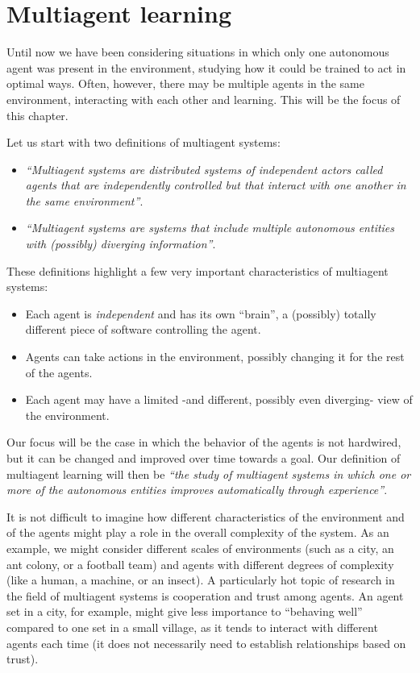 \chapter{Multiagent learning}
Until now we have been considering situations in which only one autonomous agent was present in the environment, studying how it could be trained to act in optimal ways. Often, however, there may be multiple agents in the same environment, interacting with each other and learning. This will be the focus of this chapter.

Let us start with two definitions of multiagent systems:

\begin{itemize}
    \item \textit{``Multiagent systems are distributed systems of independent actors called agents that are independently controlled but that interact with one another in the same environment''}. \cite{wooldridge02} \cite{10.1007/978-3-030-01713-2_1}
    \item \textit{``Multiagent systems are systems that include multiple autonomous entities with (possibly) diverging information''}. \cite{ShohamLeytonBrown09}
\end{itemize}

These definitions highlight a few very important characteristics of multiagent systems:

\begin{itemize}
    \item Each agent is \textit{independent} and has its own ``brain'', a (possibly) totally different piece of software controlling the agent.
    \item Agents can take actions in the environment, possibly changing it for the rest of the agents.
    \item Each agent may have a limited -and different, possibly even diverging- view of the environment.
\end{itemize}

Our focus will be the case in which the behavior of the agents is not hardwired, but it can be changed and improved over time towards a goal. Our definition of multiagent learning will then be \textit{``the study of multiagent systems in which one or more of the autonomous entities improves automatically through experience''}.

It is not difficult to imagine how different characteristics of the environment and of the agents might play a role in the overall complexity of the system. As an example, we might consider different scales of environments (such as a city, an ant colony, or a football team) and agents with different degrees of complexity (like a human, a machine, or an insect). A particularly hot topic of research in the field of multiagent systems is cooperation and trust among agents. An agent set in a city, for example, might give less importance to ``behaving well'' compared to one set in a small village, as it tends to interact with different agents each time (it does not necessarily need to establish relationships based on trust).

